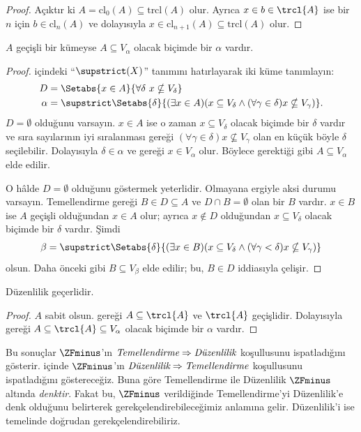 \begin{proof}
Açıktır ki $A=\text{cl}_0(A)\subseteq\text{trcl}(A)$ olur. Ayrıca
$x\in b\in\trcl{A}$ ise bir $n$ için $b\in\text{cl}_n(A)$ ve dolayısıyla
$x\in\text{cl}_{n+1}(A)\subseteq\text{trcl}(A)$ olur.
\end{proof}

\begin{lem}
$A$ geçişli bir kümeyse $A\subseteq V_\alpha$ olacak biçimde bir $\alpha$
vardır.
\end{lem}

\begin{proof}
 içindeki ``$\supstrict(X)$'' tanımını
hatırlayarak iki küme tanımlayın:
\begin{align*}
	D  &= \Setabs{x \in A}{\forall \delta\ x \nsubseteq V_\delta}\\
	\alpha &= \supstrict\Setabs{\delta}{(\exists x \in A)
	(x \subseteq V_\delta \land (\forall \gamma \in \delta)x \nsubseteq V_\gamma)}.
\end{align*}
$D=\emptyset$ olduğunu varsayın. $x\in A$ ise o zaman
$x\subseteq V_\delta$ olacak biçimde bir $\delta$ vardır ve sıra sayılarının
iyi sıralanması gereği
$(\forall\gamma\in\delta)x\nsubseteq V_\gamma$ olan en küçük böyle
$\delta$ seçilebilir. Dolayısıyla $\delta\in\alpha$ ve
 gereği $x\in V_\alpha$ olur.
Böylece gerektiği gibi $A\subseteq V_\alpha$ elde edilir.

O hâlde $D=\emptyset$ olduğunu göstermek yeterlidir. Olmayana ergiyle aksi
durumu varsayın. Temellendirme gereği
$B\in D\subseteq A$ ve $D\cap B=\emptyset$ olan bir $B$ vardır.
$x\in B$ ise $A$ geçişli olduğundan $x\in A$ olur; ayrıca $x\notin D$
olduğundan $x\subseteq V_\delta$ olacak biçimde bir $\delta$ vardır. Şimdi
\[
	\beta = \supstrict\Setabs{\delta}{(\exists x \in B)(x \subseteq V_\delta \land (\forall \gamma < \delta)x \nsubseteq V_\gamma)}
\]
olsun. Daha önceki gibi $B\subseteq V_\beta$ elde edilir; bu, $B\in D$
iddiasıyla çelişir.
\end{proof}

\begin{thm}
Düzenlilik geçerlidir.
\end{thm}

\begin{proof}
$A$ sabit olsun.  gereği
$A\subseteq\trcl{A}$ ve $\trcl{A}$ geçişlidir. Dolayısıyla
 gereği
$A\subseteq\trcl{A}\subseteq V_\alpha$ olacak biçimde bir $\alpha$ vardır.
\end{proof}

Bu sonuçlar $\ZFminus$'ın
$\emph{Temellendirme}\Rightarrow\emph{Düzenlilik}$ koşullusunu
ispatladığını gösterir. 
içinde $\ZFminus$'ın
$\emph{Düzenlilik}\Rightarrow\emph{Temellendirme}$ koşullusunu
ispatladığını göstereceğiz. Buna göre Temellendirme ile Düzenlilik
$\ZFminus$ altında \emph{denktir}. Fakat bu, $\ZFminus$ verildiğinde
Temellendirme'yi Düzenlilik'e denk olduğunu belirterek
gerekçelendirebileceğimiz anlamına gelir. Düzenlilik'i ise
\stageshier{} temelinde doğrudan gerekçelendirebiliriz.

